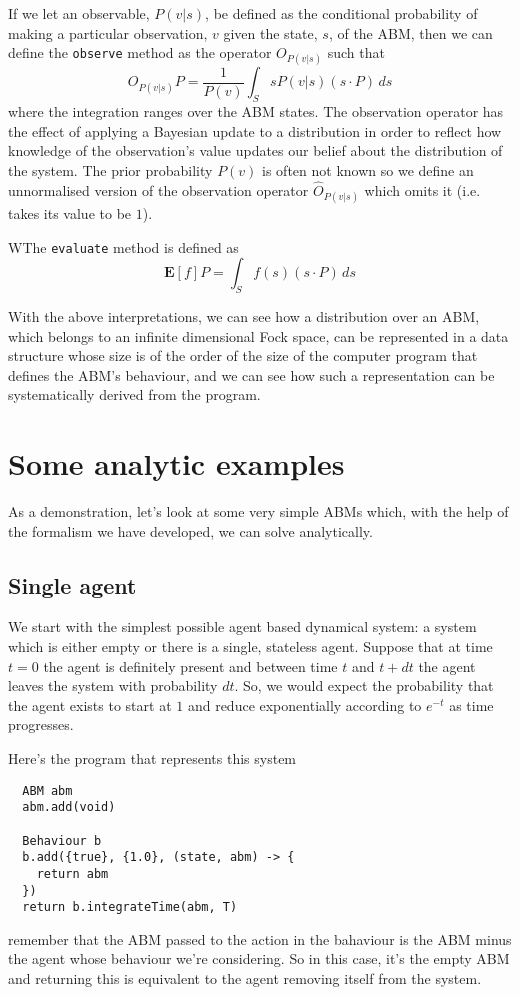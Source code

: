 \documentclass[letterpaper,twocolumn,10pt]{article}
\begin{document}
If we let an observable, $P(v|s)$, be defined as the conditional probability of making a particular observation, $v$ given the state, $s$, of the ABM,  then we can define the \texttt{observe} method as the operator $O_{P(v|s)}$ such that
\[
O_{P(v|s)}P = \frac{1}{P(v)} \int_S s P(v|s) (s\cdot P) \,ds 
\]
where the integration ranges over the ABM states. The observation operator has the effect of applying a Bayesian update to a distribution in order to reflect how knowledge of the observation's value updates our belief about the distribution of the system. The prior probability $P(v)$ is often not known so we define an unnormalised version of the observation operator $\hat{O}_{P(v|s)}$ which omits it (i.e. takes its value to be $1$).

WThe \texttt{evaluate} method is defined as
\[
\mathbf{E}[f]P = \int_S f(s) (s\cdot P) \,ds
\]

With the above interpretations, we can see how a distribution over an ABM, which belongs to an infinite dimensional Fock space, can be represented in a data structure whose size is of the order of the size of the computer program that defines the ABM's behaviour, and we can see how such a representation can be systematically derived from the program.

\section{Some analytic examples}
As a demonstration, let's look at some very simple ABMs which, with the help of the formalism we have developed, we can solve analytically.

\subsection{Single agent}
We start with the simplest possible agent based dynamical system: a system which is either empty or there is a single, stateless agent. Suppose that at time $t=0$ the agent is definitely present and between time $t$ and $t+dt$ the agent leaves the system with probability $dt$. So, we would expect the probability that the agent exists to start at $1$ and reduce exponentially according to $e^{-t}$ as time progresses.

 Here's the program that represents this system
\begin{lstlisting}
  ABM abm
  abm.add(void)
  
  Behaviour b
  b.add({true}, {1.0}, (state, abm) -> {
    return abm
  })
  return b.integrateTime(abm, T)
\end{lstlisting}
remember that the ABM passed to the action in the bahaviour is the ABM minus the agent whose behaviour we're considering. So in this case, it's the empty ABM and returning this is equivalent to the agent removing itself from the system.
\end{document}
